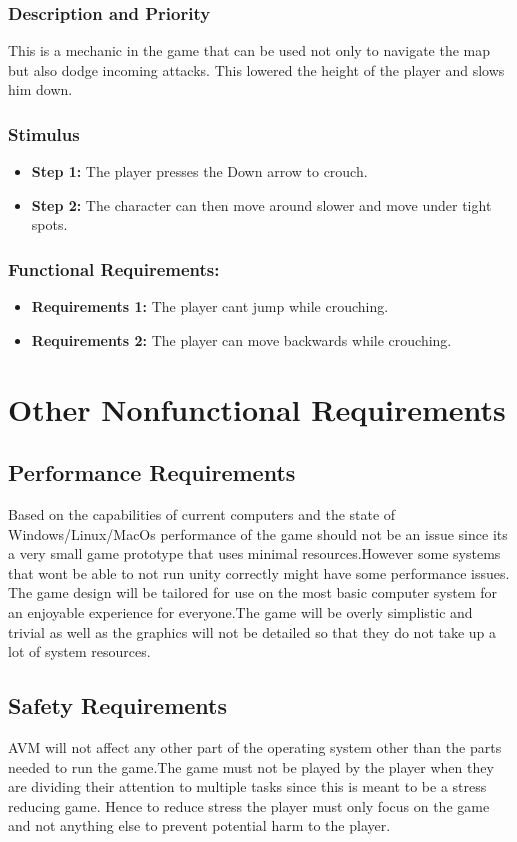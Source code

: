 \subsection{Description and Priority}
This is a mechanic in the game that can be used not only to navigate the map but also dodge incoming attacks. This lowered the height of the player and slows him down.
\subsection{Stimulus}
\begin{itemize}
    \item \textbf{Step 1:} The player presses the Down arrow to crouch.
    \item \textbf{Step 2:} The character can then move around slower and move under tight spots. 
\end{itemize}
\subsection{Functional Requirements:}
\begin{itemize}
    \item \textbf{Requirements 1:} The player cant jump while crouching.
    \item \textbf{Requirements 2:} The player can move backwards while crouching.
\end{itemize}
\chapter{Other Nonfunctional Requirements}
\label{Other Nonfunctional Requirements}

\section{Performance Requirements}
Based on the capabilities of current computers and the state of Windows/Linux/MacOs performance of the game should not be an issue since its a very small game prototype that uses minimal resources.However some systems that wont be able to not run unity correctly might have some performance issues. The game design will be tailored for use on the most basic computer system for an enjoyable experience for everyone.The game will be overly simplistic and trivial as well as the graphics will not be detailed so that they do not take up a lot of system resources. 
\section{Safety Requirements}
AVM will not affect any other part of the operating system other than the parts needed to run the game.The game must not be played by the player when they are dividing their attention to multiple tasks since this is meant to be a stress reducing game. Hence to reduce stress the player must only focus on the game and not anything else to prevent potential harm to the player.
